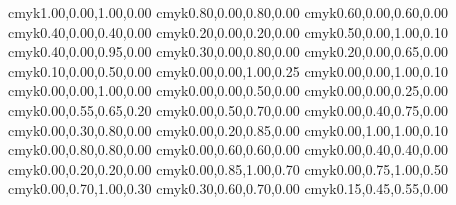 \definecolor{verydarkgreen}      {cmyk}{1.00,0.00,1.00,0.00}
\definecolor{darkgreen}          {cmyk}{0.80,0.00,0.80,0.00}
\definecolor{green}              {cmyk}{0.60,0.00,0.60,0.00}
\definecolor{lightgreen}         {cmyk}{0.40,0.00,0.40,0.00}
\definecolor{verylightgreen}     {cmyk}{0.20,0.00,0.20,0.00}
\definecolor{verydarklimegreen}  {cmyk}{0.50,0.00,1.00,0.10}
\definecolor{darklimegreen}      {cmyk}{0.40,0.00,0.95,0.00}
\definecolor{limegreen}          {cmyk}{0.30,0.00,0.80,0.00}
\definecolor{lightlimegreen}     {cmyk}{0.20,0.00,0.65,0.00}
\definecolor{verylightlimegreen} {cmyk}{0.10,0.00,0.50,0.00}
\definecolor{verydarkyellow}     {cmyk}{0.00,0.00,1.00,0.25}
\definecolor{darkyellow}         {cmyk}{0.00,0.00,1.00,0.10}
\definecolor{yellow}             {cmyk}{0.00,0.00,1.00,0.00}
\definecolor{lightyellow}        {cmyk}{0.00,0.00,0.50,0.00}
\definecolor{verylightyellow}    {cmyk}{0.00,0.00,0.25,0.00}
\definecolor{verydarkorange}     {cmyk}{0.00,0.55,0.65,0.20}
\definecolor{darkorange}         {cmyk}{0.00,0.50,0.70,0.00}
\definecolor{orange}             {cmyk}{0.00,0.40,0.75,0.00}
\definecolor{lightorange}        {cmyk}{0.00,0.30,0.80,0.00}
\definecolor{verylightorange}    {cmyk}{0.00,0.20,0.85,0.00}
\definecolor{verydarkred}        {cmyk}{0.00,1.00,1.00,0.10}
\definecolor{darkred}            {cmyk}{0.00,0.80,0.80,0.00}
\definecolor{red}                {cmyk}{0.00,0.60,0.60,0.00}
\definecolor{lightred}           {cmyk}{0.00,0.40,0.40,0.00}
\definecolor{verylightred}       {cmyk}{0.00,0.20,0.20,0.00}
\definecolor{verydarkbrown}      {cmyk}{0.00,0.85,1.00,0.70}
\definecolor{darkbrown}          {cmyk}{0.00,0.75,1.00,0.50}
\definecolor{brown}              {cmyk}{0.00,0.70,1.00,0.30}
\definecolor{lightbrown}         {cmyk}{0.30,0.60,0.70,0.00}
\definecolor{verylightbrown}     {cmyk}{0.15,0.45,0.55,0.00}
%
